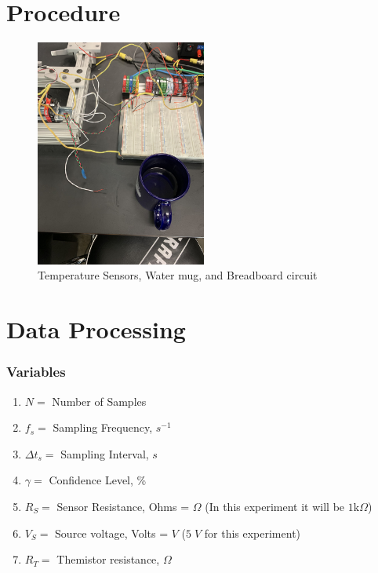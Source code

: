 \documentclass{article}
\begin{document}
\section{Procedure}
\begin{figure}[H]
\centering
\includegraphics[width=0.5\textwidth, angle = -90]{Lab 2/lab2images/circuit_board_mug_and_sensors.jpg}
\caption{Temperature Sensors, Water mug, and Breadboard circuit}
\end{figure}

\section{Data Processing}
\subsubsection*{Variables}
\begin{enumerate}[label = \roman*.]
    \item \(N = \) Number of Samples
    \item \(f_{s} = \) Sampling Frequency, $s^{-1}$
    \item \(\Delta t_{s} = \) Sampling Interval, $s$
    \item \(\gamma = \) Confidence Level, \%
    \item \(R_{S} = \) Sensor Resistance, Ohms = $\Omega$ (In this experiment it will be $1\text{k}\Omega$)
    \item \(V_{S} = \) Source voltage, Volts = $V$ ($5\;V$ for this experiment)
    \item \(R_{T} = \) Themistor resistance, $\Omega$
\end{enumerate}
\end{document}
